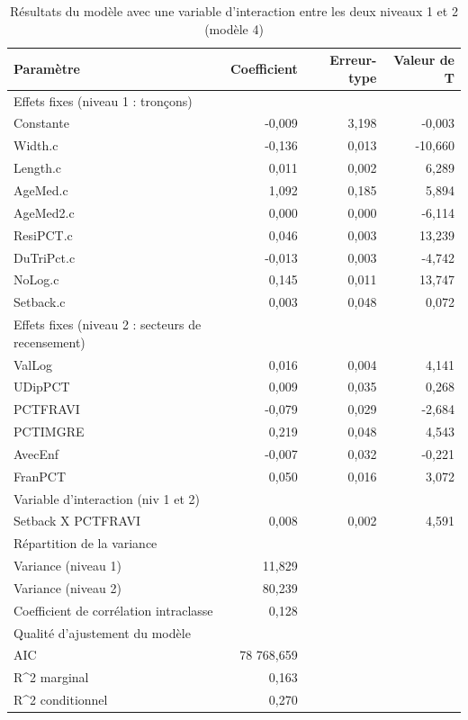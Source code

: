 \documentclass[
  11pt,
  french,
]{book}
\begin{document}
\begin{table}

\caption{\label{tab:TableauModele4}Résultats du modèle avec une variable d'interaction entre les deux niveaux 1 et 2 (modèle 4)}
\centering
\fontsize{8}{10}\selectfont
\begin{tabular}[t]{lrrr}
\toprule
Paramètre & Coefficient & Erreur-type & Valeur de T\\
\midrule
Effets fixes (niveau 1 : tronçons) &  &  & \\
Constante & -0,009 & 3,198 & -0,003\\
Width.c & -0,136 & 0,013 & -10,660\\
Length.c & 0,011 & 0,002 & 6,289\\
AgeMed.c & 1,092 & 0,185 & 5,894\\
\addlinespace
AgeMed2.c & 0,000 & 0,000 & -6,114\\
ResiPCT.c & 0,046 & 0,003 & 13,239\\
DuTriPct.c & -0,013 & 0,003 & -4,742\\
NoLog.c & 0,145 & 0,011 & 13,747\\
Setback.c & 0,003 & 0,048 & 0,072\\
\addlinespace
Effets fixes (niveau 2 : secteurs de recensement) &  &  & \\
ValLog & 0,016 & 0,004 & 4,141\\
UDipPCT & 0,009 & 0,035 & 0,268\\
PCTFRAVI & -0,079 & 0,029 & -2,684\\
PCTIMGRE & 0,219 & 0,048 & 4,543\\
\addlinespace
AvecEnf & -0,007 & 0,032 & -0,221\\
FranPCT & 0,050 & 0,016 & 3,072\\
Variable d'interaction (niv 1 et 2) &  &  & \\
Setback X PCTFRAVI & 0,008 & 0,002 & 4,591\\
Répartition de la variance &  &  & \\
\addlinespace
Variance (niveau 1) & 11,829 &  & \\
Variance (niveau 2) & 80,239 &  & \\
Coefficient de corrélation intraclasse & 0,128 &  & \\
Qualité d'ajustement du modèle &  &  & \\
AIC & 78 768,659 &  & \\
\addlinespace
R\textasciicircum{2} marginal & 0,163 &  & \\
R\textasciicircum{2} conditionnel & 0,270 &  & \\
\bottomrule
\end{tabular}
\end{table}
\end{document}
